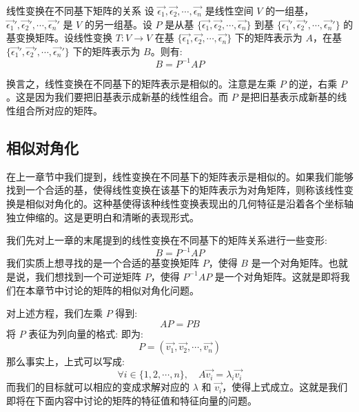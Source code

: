 \documentclass[a4paper,12pt]{ctexart}
\begin{document}
\newpage

\begin{mythm}{线性变换在不同基下矩阵的关系}{}
    设 $\vec{\epsilon_1}, \vec{\epsilon_2}, \cdots, \vec{\epsilon_n}$ 是线性空间 $V$ 的一组基，$\vec{\epsilon_1}', \vec{\epsilon_2}', \cdots, \vec{\epsilon_n}'$ 是 $V$ 的另一组基。设 $P$ 是从基 $\{\vec{\epsilon_1}, \vec{\epsilon_2}, \cdots, \vec{\epsilon_n}\}$ 到基 $\{\vec{\epsilon_1}', \vec{\epsilon_2}', \cdots, \vec{\epsilon_n}'\}$ 的基变换矩阵。设线性变换 $T: V \to V$ 在基 $\{\vec{\epsilon_1}, \vec{\epsilon_2}, \cdots, \vec{\epsilon_n}\}$ 下的矩阵表示为 $A$，在基 $\{\vec{\epsilon_1}', \vec{\epsilon_2}', \cdots, \vec{\epsilon_n}'\}$ 下的矩阵表示为 $B$。则有:
    \[
    B = P^{-1} A P
    \]
    
    换言之，线性变换在不同基下的矩阵表示是相似的。注意是左乘 $P$ 的逆，右乘 $P$。这是因为我们要把旧基表示成新基的线性组合。而 $P$ 是把旧基表示成新基的线性组合所对应的矩阵。
\end{mythm}

\subsection{相似对角化}

在上一章节中我们提到，线性变换在不同基下的矩阵表示是相似的。如果我们能够找到一个合适的基，使得线性变换在该基下的矩阵表示为对角矩阵，则称该线性变换是相似对角化的。这种基使得该种线性变换表现出的几何特征是沿着各个坐标轴独立伸缩的。这是更明白和清晰的表现形式。

我们先对上一章的末尾提到的线性变换在不同基下的矩阵关系进行一些变形:
\[
B = P^{-1} A P
\]
我们实质上想寻找的是一个合适的基变换矩阵 $P$，使得 $B$ 是一个对角矩阵。也就是说，我们想找到一个可逆矩阵 $P$，使得 $P^{-1} A P$ 是一个对角矩阵。这就是即将我们在本章节中讨论的矩阵的相似对角化问题。

对上述方程，我们左乘 $P$ 得到:
\[
A P = P B
\]
将 $P$ 表征为列向量的格式: 即为:
\[P = (\vec{v_1}, \vec{v_2}, \cdots, \vec{v_n})\]
那么事实上，上式可以写成:
\[
\forall i \in \{1, 2, \cdots, n\}, \quad A \vec{v_i} = \lambda_i \vec{v_i}
\]
而我们的目标就可以相应的变成求解对应的 $\lambda$ 和 $\vec{v_i}$，使得上式成立。这就是我们即将在下面内容中讨论的矩阵的特征值和特征向量的问题。
\end{document}
